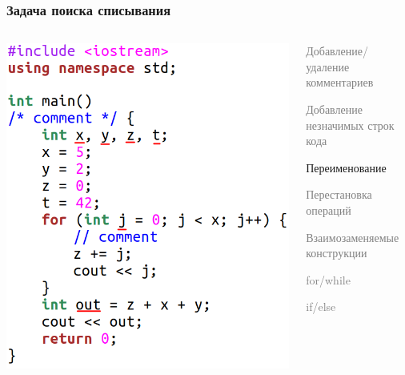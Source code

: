 \documentclass[10pt]{beamer}
\begin{document}
\begin{frame}[fragile]\frametitle{Задача поиска списывания}
	\centering
	\begin{columns}
		\centering
		\includegraphics[scale=0.7]{renamed.png}
		
		\centering
		\begin{itemize}
			\item \textcolor{gray}{Добавление/удаление комментариев
			\item Добавление незначимых строк кода}
				\item Переименование
				\textcolor{gray}{
				\item Перестановка операций
				\item Взаимозаменяемые конструкции
			}
			\begin{itemize}
				\item \textcolor{gray}{for/while
					\item if/else
				}
			\end{itemize}
		\end{itemize}
	\end{columns}
\end{frame}
\end{document}
